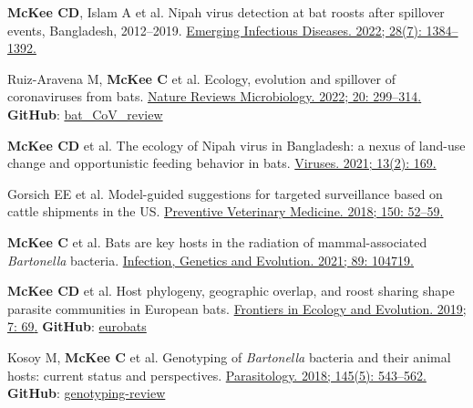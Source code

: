 \documentclass[letterpaper]{deedy-resume} %
\begin{document}
\begin{tightenumerate}

\item \textbf{McKee CD}\textsuperscript{\dag}, Islam A\textsuperscript{\dag} et al. Nipah virus detection at bat roosts after spillover events, Bangladesh, 2012–2019. \href{https://doi.org/10.3201/eid2807.212614}{\textcolor{special}{Emerging Infectious Diseases. 2022; 28(7): 1384--1392}.} \label{item1}

\item Ruiz-Aravena M\textsuperscript{\dag}, \textbf{McKee C}\textsuperscript{\dag} et al. Ecology, evolution and spillover of coronaviruses from bats. \href{https://doi.org/10.1038/s41579-021-00652-2}{\textcolor{special}{Nature Reviews Microbiology. 2022; 20: 299--314}.} \label{item2} \textbf{GitHub}: \href{https://github.com/clifmckee/bat_CoV_review}{\textcolor{special}{bat\_CoV\_review}}

\item \textbf{McKee CD} et al. The ecology of Nipah virus in Bangladesh: a nexus of land-use change and opportunistic feeding behavior in bats. \href{https://doi.org/10.3390/v13020169}{\textcolor{special}{Viruses. 2021; 13(2): 169}.} \label{item3}

\item Gorsich EE et al. Model-guided suggestions for targeted surveillance based on cattle shipments in the US. \href{https://doi.org/10.1016/j.prevetmed.2017.12.004}{\textcolor{special}{Preventive Veterinary Medicine. 2018; 150: 52--59}.} \label{item4}

\item \textbf{McKee C} et al. Bats are key hosts in the radiation of mammal-associated \textit{Bartonella} bacteria. \href{https://doi.org/10.1016/j.meegid.2021.104719}{\textcolor{special}{Infection, Genetics and Evolution. 2021; 89: 104719}.} \label{item5}

\item \textbf{McKee CD} et al. Host phylogeny, geographic overlap, and roost sharing shape parasite communities in European bats. \href{https://doi.org/10.3389/fevo.2019.00069}{\textcolor{special}{Frontiers in Ecology and Evolution. 2019; 7: 69}.} \label{item6} \textbf{GitHub}: \href{https://github.com/clifmckee/eurobats}{\textcolor{special}{eurobats}}

\item Kosoy M\textsuperscript{\dag}, \textbf{McKee C}\textsuperscript{\dag} et al. Genotyping of \textit{Bartonella} bacteria and their animal hosts: current status and perspectives. \href{https://doi.org/10.1017/S0031182017001263}{\textcolor{special}{Parasitology. 2018; 145(5): 543--562}.} \label{item7} \textbf{GitHub}: \href{https://github.com/clifmckee/genotyping-review}{\textcolor{special}{genotyping-review}}


\end{tightenumerate}
\end{document}
